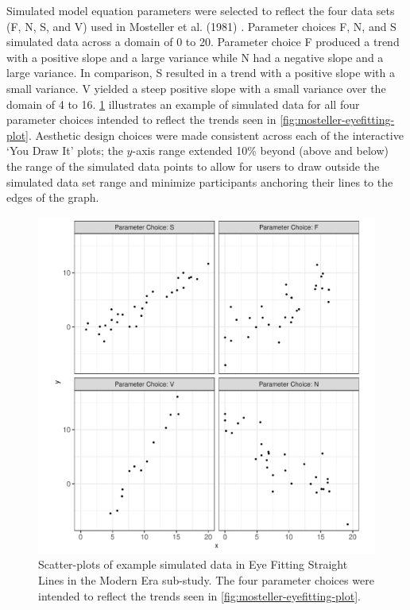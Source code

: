 \documentclass[print]{nuthesis}
\begin{document}
Simulated model equation parameters were selected to reflect the four data sets (F, N, S, and V) used in Mosteller et al. (1981) .
Parameter choices F, N, and S simulated data across a domain of 0 to 20.
Parameter choice F produced a trend with a positive slope and a large variance while N had a negative slope and a large variance.
In comparison, S resulted in a trend with a positive slope with a small variance. V yielded a steep positive slope with a small variance over the domain of 4 to 16.
\cref{fig:eyefitting-simplot} illustrates an example of simulated data for all four parameter choices intended to reflect the trends seen in \cref{fig:mosteller-eyefitting-plot}.
Aesthetic design choices were made consistent across each of the interactive `You Draw It' plots; the \(y\)-axis range extended 10\% beyond (above and below) the range of the simulated data points to allow for users to draw outside the simulated data set range and minimize participants anchoring their lines to the edges of the graph.

\begin{figure}[tbp]

{\centering \includegraphics[width=1\linewidth,]{thesis_files/figure-latex/eyefitting-simplot-1} 

}

\caption[Eye Fitting Straight Lines in the Modern Era simulated data example]{Scatter-plots of example simulated data in Eye Fitting Straight Lines in the Modern Era sub-study. The four parameter choices were intended to reflect the trends seen in \cref{fig:mosteller-eyefitting-plot}.}\label{fig:eyefitting-simplot}
\end{figure}
\end{document}
